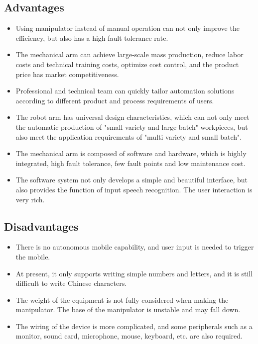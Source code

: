 \documentclass{hci}
\begin{document}
\subsection{Advantages}
\begin{itemize}
	\item Using manipulator instead of manual operation can not only improve the efficiency, but also has a high fault tolerance rate.
	\item The mechanical arm can achieve large-scale mass production, reduce labor costs and technical training costs, optimize cost control, and the product price has market competitiveness.
	\item Professional and technical team can quickly tailor automation solutions according to different product and process requirements of users.
	\item The robot arm has universal design characteristics, which can not only meet the automatic production of "small variety and large batch" workpieces, but also meet the application requirements of "multi variety and small batch".
	\item The mechanical arm is composed of software and hardware, which is highly integrated, high fault tolerance, few fault points and low maintenance cost.
	\item The software system not only develops a simple and beautiful interface, but also provides the function of input speech recognition. The user interaction is very rich.
\end{itemize}

\subsection{Disadvantages}
\begin{itemize}
	\item There is no autonomous mobile capability, and user input is needed to trigger the mobile.
	\item At present, it only supports writing simple numbers and letters, and it is still difficult to write Chinese characters.
	\item The weight of the equipment is not fully considered when making the manipulator. The base of the manipulator is unstable and may fall down.
	\item The wiring of the device is more complicated, and some peripherals such as a monitor, sound card, microphone, mouse, keyboard, etc. are also required.
\end{itemize}
\end{document}
